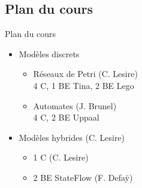 \documentclass[compress]{beamer}
\begin{document}
\subsection{Plan du cours}
\begin{frame}{Plan du cours}
\begin{itemize}
\item Modèles discrets
	\begin{itemize}
	\item Réseaux de Petri (C. Lesire)\\
		\small 4 C, 1 BE Tina, 2 BE Lego
	\item Automates (J. Brunel)\\
		\small 4 C, 2 BE Uppaal
	\end{itemize}
\item Modèles hybrides (C. Lesire)
	\begin{itemize}
	\item 1 C (C. Lesire)
	\item 2 BE StateFlow (F. Defaÿ)
	\end{itemize}
\end{itemize}
\end{frame}
\end{document}
